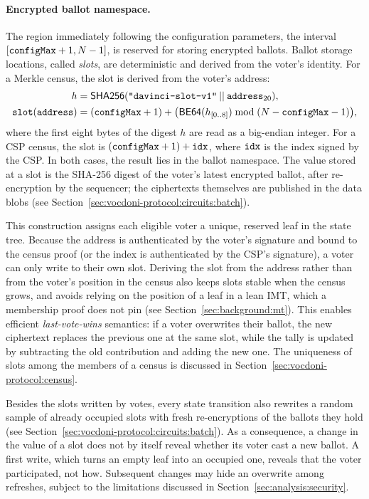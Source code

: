 \paragraph{Encrypted ballot namespace.}

The region immediately following the configuration parameters, the interval $[\texttt{configMax} + 1, N - 1]$, is reserved for storing encrypted ballots.
Ballot storage locations, called \emph{slots}, are deterministic and derived from the voter's identity. For a Merkle census, the slot is derived from the voter's address:
\begin{equation}
	\begin{aligned}
		h &= {\sf{SHA256}}(\texttt{"davinci-slot-v1"} \:||\: \texttt{address}_{\text{20}}),\\
		\texttt{slot}(\texttt{address}) &= (\texttt{configMax} + 1) + \bigl(\mathsf{BE64}(h_{[0..8]}) \bmod (N - \texttt{configMax} - 1)\bigr),
	\end{aligned}
	\label{eq:slot}
\end{equation}
where the first eight bytes of the digest $h$ are read as a big-endian integer. For a \ac{CSP} census, the slot is $(\texttt{configMax} + 1) + \texttt{idx}$, where $\texttt{idx}$ is the index signed by the \ac{CSP}. In both cases, the result lies in the ballot namespace. The value stored at a slot is the SHA-256 digest of the voter's latest encrypted ballot, after re-encryption by the sequencer; the ciphertexts themselves are published in the data blobs (see Section~\ref{sec:vocdoni-protocol:circuits:batch}).

This construction assigns each eligible voter a unique, reserved leaf in the state tree. Because the address is authenticated by the voter's signature and bound to the census proof (or the index is authenticated by the \ac{CSP}'s signature), a voter can only write to their own slot. Deriving the slot from the address rather than from the voter's position in the census also keeps slots stable when the census grows, and avoids relying on the position of a leaf in a lean \ac{IMT}, which a membership proof does not pin (see Section~\ref{sec:background:mt}). This enables efficient \emph{last-vote-wins} semantics: if a voter overwrites their ballot, the new ciphertext replaces the previous one at the same slot, while the tally is updated by subtracting the old contribution and adding the new one. The uniqueness of slots among the members of a census is discussed in Section~\ref{sec:vocdoni-protocol:census}.

Besides the slots written by votes, every state transition also rewrites a random sample of already occupied slots with fresh re-encryptions of the ballots they hold (see Section~\ref{sec:vocdoni-protocol:circuits:batch}). As a consequence, a change in the value of a slot does not by itself reveal whether its voter cast a new ballot. A first write, which turns an empty leaf into an occupied one, reveals that the voter participated, not how. Subsequent changes may hide an overwrite among refreshes, subject to the limitations discussed in Section~\ref{sec:analysis:security}.


